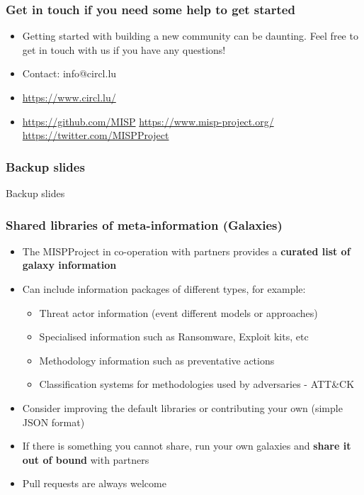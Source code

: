\begin{frame}
\frametitle{Get in touch if you need some help to get started}
\begin{itemize}
\item Getting started with building a new community can be daunting. Feel free to get in touch with us if you have any questions!
\item Contact: info@circl.lu
\item \url{https://www.circl.lu/}
\item \url{https://github.com/MISP}  \url{https://www.misp-project.org/}  \url{https://twitter.com/MISPProject}
\end{itemize}
\end{frame}

\begin{frame}
\frametitle{Backup slides}
{\center Backup slides}
\end{frame}

\begin{frame}
\frametitle{Shared libraries of meta-information (Galaxies)}
\begin{itemize}
    \item The MISPProject in co-operation with partners provides a {\bf curated list of galaxy information}
	\item Can include information packages of different types, for example:
	\begin{itemize}
        \item Threat actor information (event different models or approaches)
		\item Specialised information such as Ransomware, Exploit kits, etc
		\item Methodology information such as preventative actions
		\item Classification systems for methodologies used by adversaries - ATT\&CK
	\end{itemize}
	\item Consider improving the default libraries or contributing your own (simple JSON format)
    \item If there is something you cannot share, run your own galaxies and {\bf share it out of bound} with partners
	\item Pull requests are always welcome
\end{itemize}
\end{frame}

